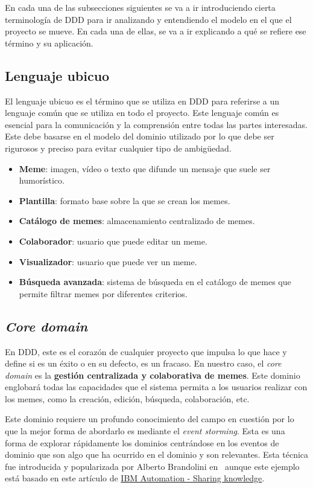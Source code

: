 En cada una de las subsecciones siguientes se va a ir introduciendo cierta terminología de DDD para ir analizando y entendiendo el modelo en el que el proyecto se mueve. En cada una de ellas, se va a ir explicando a qué se refiere ese término y su aplicación.

\subsection{Lenguaje ubicuo}

El lenguaje ubicuo es el término que se utiliza en DDD para referirse a un lenguaje común que se utiliza en todo el proyecto. Este lenguaje común es esencial para la comunicación y la comprensión entre todas las partes interesadas. Este debe basarse en el modelo del dominio utilizado por lo que debe ser rigurosos y preciso para evitar cualquier tipo de ambigüedad.

\begin{itemize}
    \item \textbf{Meme}: imagen, vídeo o texto que difunde un mensaje que suele ser humorístico.
    \item \textbf{Plantilla}: formato base sobre la que se crean los memes.
    \item \textbf{Catálogo de memes}: almacenamiento centralizado de memes.
    \item \textbf{Colaborador}: usuario que puede editar un meme.
    \item \textbf{Visualizador}: usuario que puede ver un meme.
    \item \textbf{Búsqueda avanzada}: sistema de búsqueda en el catálogo de memes que permite filtrar memes por diferentes criterios.
\end{itemize}

\subsection{\textit{Core domain}}

En DDD, este es el corazón de cualquier proyecto que impulsa lo que hace y define si es un éxito o en su defecto, es un fracaso. En nuestro caso, el \textit{core domain} es la \textbf{gestión centralizada y colaborativa de memes}. Este dominio englobará todas las capacidades que el sistema permita a los usuarios realizar con los memes, como la creación, edición, búsqueda, colaboración, etc.

Este dominio requiere un profundo conocimiento del campo en cuestión por lo que la mejor forma de abordarlo es mediante el \textit{event storming}. Esta es una forma de explorar rápidamente los dominios centrándose en los eventos de dominio que son algo que ha ocurrido en el dominio y son relevantes. Esta técnica fue introducida y popularizada por Alberto Brandolini en~\cite{brandolini2013introducing} aunque este ejemplo está basado en este artículo de \href{https://ibm-cloud-architecture.github.io/refarch-eda/methodology/event-storming/}{IBM Automation - Sharing knowledge}.

